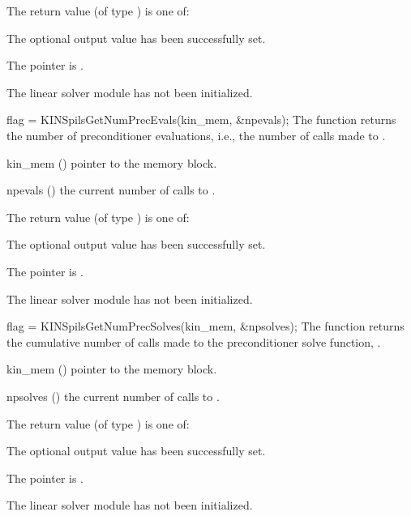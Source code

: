{
  The return value  (of type ) is one of:
  \begin{args}
  \item[\Id{KINSPILS\_SUCCESS}] 
    The optional output value has been successfully set.
  \item[\Id{KINSPILS\_MEM\_NULL}]
    The  pointer is .
  \item[\Id{KINSPILS\_LMEM\_NULL}]
    The linear solver module has not been initialized.
  \end{args}
}
{}
{
  flag = KINSpilsGetNumPrecEvals(kin\_mem, \&npevals);
}
{
  The function  returns the
  number of preconditioner evaluations, i.e., the number of 
  calls made to .
}
{
  \begin{args}
  \item[kin\_mem] ()
    pointer to the {\kinsol} memory block.
  \item[npevals] ()
    the current number of calls to .
  \end{args}
}
{
  The return value  (of type ) is one of:
  \begin{args}
  \item[\Id{KINSPILS\_SUCCESS}] 
    The optional output value has been successfully set.
  \item[\Id{KINSPILS\_MEM\_NULL}]
    The  pointer is .
  \item[\Id{KINSPILS\_LMEM\_NULL}]
    The linear solver module has not been initialized.
  \end{args}
}
{}
{
  flag = KINSpilsGetNumPrecSolves(kin\_mem, \&npsolves);
}
{
  The function  returns the
  cumulative number of calls made to the preconditioner 
  solve function, .
}
{
  \begin{args}
  \item[kin\_mem] ()
    pointer to the {\kinsol} memory block.
  \item[npsolves] ()
    the current number of calls to .
  \end{args}
}
{
  The return value  (of type ) is one of:
  \begin{args}
  \item[\Id{KINSPILS\_SUCCESS}] 
    The optional output value has been successfully set.
  \item[\Id{KINSPILS\_MEM\_NULL}]
    The  pointer is .
  \item[\Id{KINSPILS\_LMEM\_NULL}]
    The linear solver module has not been initialized.
  \end{args}
}
